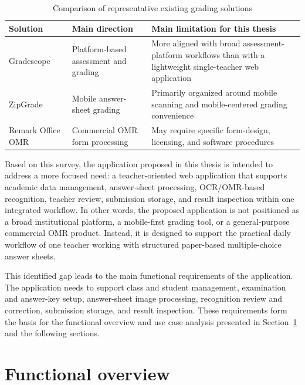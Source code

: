 \documentclass[../Main.tex]{subfiles}
\begin{document}
\begin{table}[H]
    \centering
    \caption{Comparison of representative existing grading solutions}
    \label{table:status_survey_comparison}
    \renewcommand{\arraystretch}{1.25}
    \begin{tabular}{|p{}|p{}|p{}|}
        \hline
        \textbf{Solution} & \textbf{Main direction} & \textbf{Main limitation for this thesis} \\
        \hline
        Gradescope~\cite{gradescope2026} & Platform-based assessment and grading & More aligned with broad assessment-platform workflows than with a lightweight single-teacher web application \\
        \hline
        ZipGrade~\cite{zipgrade2026} & Mobile answer-sheet grading & Primarily organized around mobile scanning and mobile-centered grading convenience \\
        \hline
        Remark Office OMR~\cite{remarkoffice2026} & Commercial OMR form processing & May require specific form-design, licensing, and software procedures \\
        \hline
    \end{tabular}
\end{table}

Based on this survey, the application proposed in this thesis is intended to
address a more focused need: a teacher-oriented web application that supports
academic data management, answer-sheet processing, OCR/OMR-based recognition,
teacher review, submission storage, and result inspection within one integrated
workflow. In other words, the proposed application is not positioned as a broad
institutional platform, a mobile-first grading tool, or a general-purpose
commercial OMR product. Instead, it is designed to support the practical daily
workflow of one teacher working with structured paper-based multiple-choice
answer sheets.

This identified gap leads to the main functional requirements of the
application. The application needs to support class and student management,
examination and answer-key setup, answer-sheet image processing, recognition
review and correction, submission storage, and result inspection. These
requirements form the basis for the functional overview and use case analysis
presented in Section~\ref{section:2.2} and the following sections.

\section{Functional overview}
\label{section:2.2}
\end{document}
